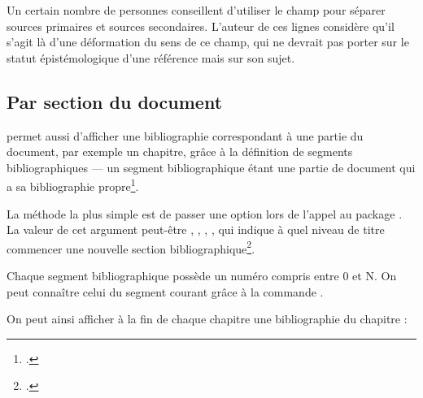 \begin{plusloins}
    Un certain nombre de personnes conseillent d'utiliser le champ  pour séparer sources primaires et sources secondaires. L'auteur de ces lignes considère qu'il s'agit là d'une déformation du sens de ce champ, qui ne devrait pas porter sur le statut épistémologique d'une référence mais sur son sujet. 
\end{plusloins}

\subsection{Par section du document}

 permet aussi d'afficher une bibliographie correspondant à une partie du document, par exemple un chapitre,  grâce à la définition de segments bibliographiques --- un segment bibliographique étant une partie de document qui a sa bibliographie propre\footcites[En réalité  propose deux choses différentes : \enquote{segment} et \enquote{section} bibliographiques. Seules les sections bibliographiques ont réellement une bibliographie propre, dans la mesure où, si on utilise un style numéroté de bibliographie, la numérotation recommence à chaque changement de section, mais pas à chaque changement de segment. Toutefois il est rare en sciences humaines d'utiliser un style bibliographique numéroté. C'est pourquoi nous ne parlons ici que des segments bibliographiques et non pas des sections bibliographiques. Voir :][ainsi que :]{biblatex_section}[][]{biblatex_segment}.

La méthode la plus simple est de passer une option  lors de l'appel au package . La valeur de cet argument peut-être , , , , qui indique à quel niveau de titre commencer une nouvelle section bibliographique\footcite[Il est toutefois possible de créer des sections bibliographiques autrement que par niveaux de titre, voir :][]{biblatex_segment}.

Chaque segment bibliographique possède un numéro compris entre 0 et N. On peut connaître celui du segment courant grâce à la commande .

On peut ainsi afficher à la fin de chaque chapitre une bibliographie du chapitre :

